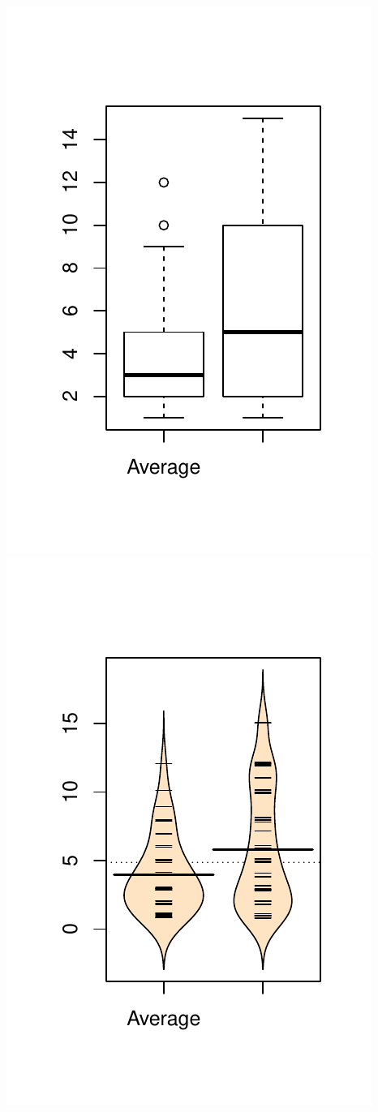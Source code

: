 \documentclass[]{book}
\begin{document}
\includegraphics{GreenwoodBanner_files/figure-latex/Figure2-6-1.pdf}
\includegraphics{GreenwoodBanner_files/figure-latex/Figure2-6-2.pdf}
\end{document}
